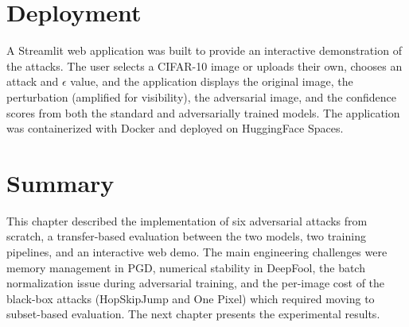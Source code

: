 \section{Deployment}

A Streamlit web application was built to provide an interactive demonstration of the attacks. The user selects a CIFAR-10 image or uploads their own, chooses an attack and $\epsilon$ value, and the application displays the original image, the perturbation (amplified for visibility), the adversarial image, and the confidence scores from both the standard and adversarially trained models. The application was containerized with Docker and deployed on HuggingFace Spaces.

\section{Summary}

This chapter described the implementation of six adversarial attacks from scratch, a transfer-based evaluation between the two models, two training pipelines, and an interactive web demo. The main engineering challenges were memory management in PGD, numerical stability in DeepFool, the batch normalization issue during adversarial training, and the per-image cost of the black-box attacks (HopSkipJump and One Pixel) which required moving to subset-based evaluation. The next chapter presents the experimental results.

